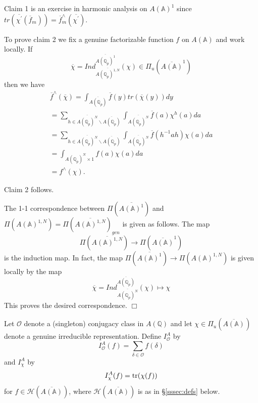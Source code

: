 Claim 1 is an exercise in harmonic analysis on $A({\mathbb{A}})^1$ since
$tr(\overline{\chi ^{\prime }}(\overline{f}_m))
=\overline{f}_m^{\wedge }(\overline{\chi ^{\prime }})$.

To prove claim 2 we fix a genuine factorizable function $f$ on $A({\mathbb{A}})$
and work locally. If 
\[
\overline{\chi }=
Ind_{\overline{A({\mathbb{Q}}_p)^{1,N}}}^{\overline{A({\mathbb{Q}}_p)^1}}
(\chi )\in \Pi_u (\overline{A({\mathbb{A}})}^1)
\]
then we have 
\begin{equation}\label{eq:3.20}
\begin{array}{c}
\overline{f}^{\wedge }(\overline{\chi })
=\int_{\overline{A({\mathbb{Q}}_p)}}
\overline{f}(y)tr(\overline{\chi }(y))dy \\ 
=\sum_{h\in \overline{A({\mathbb{Q}}_p)^N}
\backslash \overline{A({\mathbb{Q}}_p)}}
\int_{\overline{A({\mathbb{Q}}_p)^N}}
\overline{f}(a)\chi ^h(a)da \\ 
=\sum_{h\in \overline{A({\mathbb{Q}}_p)^N}
\backslash \overline{A({\mathbb{Q}}_p)}}
\int_{\overline{A({\mathbb{Q}}_p)^N}}
\overline{f}(h^{-1}ah)\chi (a)da \\ 
=\int_{A({\mathbb{Q}}_p)^N\times 1}
f(a)\chi (a)da \\ 
=f^{\wedge }(\chi ).
\end{array}
\end{equation}

Claim 2 follows.

The 1-1 correspondence between $\Pi (\overline{A({\mathbb{A}})^1})$ and
$\Pi (A({\mathbb{A}})^{1,N})=\Pi (\overline{A({\mathbb{A}})^{1,N}})_{gen}$
is given as follows. The map 
\[
\Pi (\overline{A({\mathbb{A}})^{1,N}})
\rightarrow \Pi (\overline{A({\mathbb{A}})}^1)
\]
is the induction map. In fact, the map
$\Pi (\overline{A({\mathbb{A}})^1})\rightarrow
\Pi (A({\mathbb{A}})^{1,N})$
is given locally by the map 
\[
\overline{\chi }
=Ind_{\overline{A({\mathbb{Q}}_p)^N}}^{\overline{A({\mathbb{Q}}_p)}}
(\chi )\longmapsto \chi 
\]
This proves the desired correspondence. $\Box $

Let ${\mathcal{O}}$ denote a (singleton) conjugacy
class in $A({\mathbb{Q}})$ and let
$\chi\in \Pi_u(\overline{A({\mathbb{A}})})$ denote a genuine irreducible
representation. Define $I^A_{\mathcal{O}}$ by
\begin{equation}\label{eq:3.21}
I^A_{\mathcal{O}}(f)=
\sum_{\delta\in {\mathcal{O}}}
f(\delta)
\end{equation}
and $I^A_{\chi}$ by
\begin{equation}\label{eq:3.22}
I^A_{\chi}(f)=
{\rm tr}(\chi(f)) 
\end{equation}
for $f\in {\mathcal{H}}(\overline{A({\mathbb{A}})})$, where
${\mathcal{H}}(\overline{A({\mathbb{A}})})$ is as in \S\ref{sssec:defs} below.


